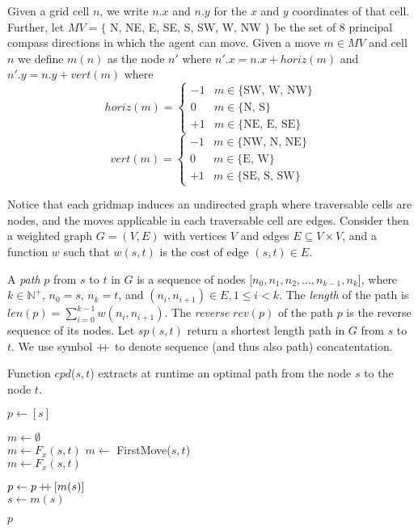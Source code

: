 Given a grid cell $n$, we write $n.x$ and $n.y$ for the $x$ and $y$ 
coordinates of that cell.
Further, let $MV = \{$ N, NE, E, SE, S, SW, W, NW $\}$ be the set of 8 
principal compass directions in which the agent can move.
Given a move $m \in MV$ and cell $n$ we define $m(n)$ as the node 
$n'$ where $n'.x = n.x + horiz(m)$ and $n'.y = n.y + vert(m)$
where
$$
horiz(m) = \left\{ \begin{array}{ll}
                    -1 & m \in \{\mbox{SW, W, NW}\} \\
                    0  & m \in \{\mbox{N, S}\} \\
                    +1 & m \in \{\mbox{NE, E, SE}\}
                    \end{array}\right.
$$
$$
vert(m) = \left\{ \begin{array}{ll}
                    -1 & m \in \{\mbox{NW, N, NE}\} \\
                    0  & m \in \{\mbox{E, W}\} \\
                    +1 & m \in \{\mbox{SE, S, SW}\}
                    \end{array}\right.
$$

Notice that each gridmap induces an undirected graph where traversable 
cells are nodes, and the moves applicable in each traversable cell are edges. 
Consider then a weighted
graph $G = (V,E)$ with vertices $V$ and edges $E \subseteq V \times V$,
and a function $w$ such that $w(s,t)$ is the cost of edge
$(s,t) \in E$.

A \emph{path} $p$ from $s$ to $t$ in $G$ is a sequence of nodes
[$n_0,n_1,n_2, \ldots, n_{k-1},n_k$], where $k \in \mathbb{N}^+$, $n_0 = s$, $n_k = t$, and $(n_i,n_{i+1}) \in E, 1 \leq i < k$.
The \emph{length} of the path is $len(p) = \sum_{i=0}^{k-1} w(n_i,n_{i+1})$.
The \emph{reverse}  $rev(p)$ of the path $p$ is the reverse sequence of its nodes.
Let $sp(s,t)$ return a shortest length path in $G$ from $s$ to $t$.
We use symbol $\mbox{+\!\!+}$ to denote sequence (and thus also path) concatentation.

\begin{algorithm}[t]
  \caption{Function $cpd$($s, t$) extracts at runtime an
  optimal path from the node $s$ to the node $t$.}
  \label{alg:retrieve}
$p \gets [s]$ \\
      {

      $m \gets \emptyset$\\
      {
         $m \gets F_x(s, t)$
      }
      \Else
      {
      $m \gets$ \textsf{FirstMove}($s,t$) \\
      {$m \gets F_x(s,t)$}
      }

      $p \gets p\, \mbox{+\!\!+}\, [m(s)]$ \\ 
      $s \gets m(s)$
      }
\Return $p$
\end{algorithm}

